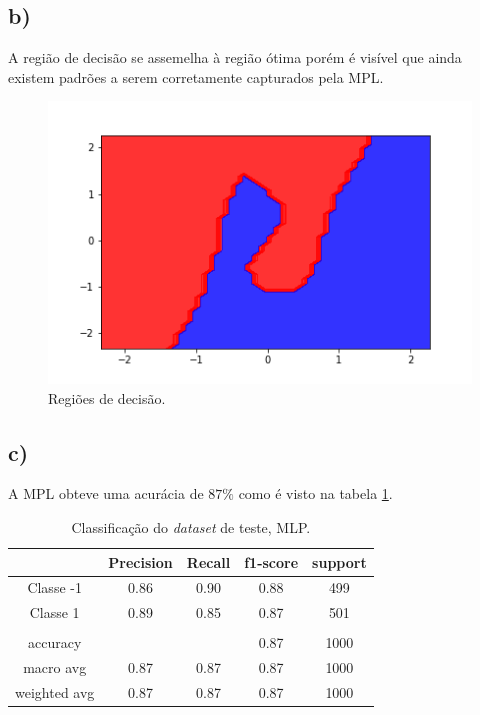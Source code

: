 \documentclass{article}
\begin{document}
    \subsection*{b)}
    A região de decisão se assemelha à região ótima porém é visível que ainda existem padrões
    a serem corretamente capturados pela MPL.
    \begin{figure}[H]
        \centering
        \includegraphics[width=\linewidth]{mpl_decision.png}   
        \caption{Regiões de decisão.}
        \label{fig:mpl_decision}
    \end{figure}

    \subsection*{c)}
    A MPL obteve uma acurácia de $87\%$ como é visto na tabela \ref{tbl:mpl_test}.
    \begin{table}[H]
        \begin{tabular}{c|c|c|c|c|}
        \cline{2-5}
                                        & \textbf{Precision} & \textbf{Recall} & \textbf{f1-score} & \textbf{support} \\ \hline
        \multicolumn{1}{|c|}{Classe -1}    & 0.86               & 0.90            & 0.88              & 499              \\ \hline
        \multicolumn{1}{|c|}{Classe 1}     & 0.89               & 0.85            & 0.87              & 501              \\ \hline
        \multicolumn{1}{|c|}{}             &                    &                 &                   &                  \\ \hline
        \multicolumn{1}{|c|}{accuracy}     &                    &                 & 0.87              & 1000             \\ \hline
        \multicolumn{1}{|c|}{macro avg}    & 0.87               & 0.87            & 0.87              & 1000             \\ \hline
        \multicolumn{1}{|c|}{weighted avg} & 0.87               & 0.87            & 0.87              & 1000             \\ \hline
        \end{tabular}
        \caption{Classificação do \textit{dataset} de teste, MLP.}
        \label{tbl:mpl_test}
    \end{table}
\end{document}
